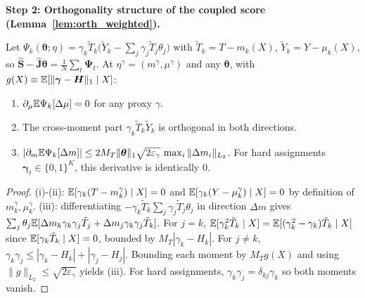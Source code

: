 \textbf{Step 2: Orthogonality structure of the coupled score (Lemma~\ref{lem:orth_weighted}).}
\begin{lemma}
\label{lem:orth_weighted}
Let $\Psi_{k}(\boldsymbol\theta;\eta)=\gamma_k\tilde T_k\big(\tilde Y_k-\sum_{j}\gamma_j\tilde T_j\theta_j\big)$ with $\tilde T_k=T-m_k(X)$, $\tilde Y_k=Y-\mu_k(X)$, so $\hat{\boldsymbol S}-\hat{\boldsymbol J}\boldsymbol\theta=\frac1N\sum_t\boldsymbol\Psi_t$. At $\eta^\gamma=(m^\gamma,\mu^\gamma)$ and any $\boldsymbol\theta$, with $g(X)\equiv\mathbb{E}[\|\boldsymbol\gamma-\boldsymbol H\|_1\mid X]$:
\begin{enumerate}\setlength{\itemsep}{0pt}\setlength{\parskip}{0pt}
\item[(i)] $\partial_\mu\mathbb{E}\Psi_k[\Delta\mu]=0$ for any proxy $\gamma$.
\item[(ii)] The cross-moment part $\gamma_k\tilde T_k\tilde Y_k$ is orthogonal in both directions.
\item[(iii)] $|\partial_m\mathbb{E}\Psi_k[\Delta m]|\le 2M_T\|\boldsymbol\theta\|_1\sqrt{2\varepsilon_\gamma}\,\max_i\|\Delta m_i\|_{L_2}$. For hard assignments $\boldsymbol\gamma_t\in\{0,1\}^K$, this derivative is identically $0$.
\end{enumerate}
\end{lemma}
\begin{proof}
(i)-(ii): $\mathbb{E}[\gamma_k(T-m_k^\gamma)\mid X]=0$ and $\mathbb{E}[\gamma_k(Y-\mu_k^\gamma)\mid X]=0$ by definition of $m_k^\gamma,\mu_k^\gamma$.
(iii): differentiating $-\gamma_k\tilde T_k \sum_j \gamma_j \tilde T_j \theta_j$ in direction $\Delta m$ gives $\sum_j \theta_j \mathbb{E}[\Delta m_k \gamma_k \gamma_j \tilde T_j + \Delta m_j \gamma_k \gamma_j \tilde T_k]$. For $j=k$, $\mathbb{E}[\gamma_k^2 \tilde T_k \mid X] = \mathbb{E}[(\gamma_k^2 - \gamma_k)\tilde T_k \mid X]$ since $\mathbb{E}[\gamma_k \tilde T_k \mid X] = 0$, bounded by $M_T |\gamma_k - H_k|$. For $j \neq k$, $\gamma_k \gamma_j \le |\gamma_k - H_k| + |\gamma_j - H_j|$. Bounding each moment by $M_T g(X)$ and using $\|g\|_{L_2} \le \sqrt{2\varepsilon_\gamma}$ yields (iii). For hard assignments, $\gamma_k \gamma_j = \delta_{kj} \gamma_k$ so both moments vanish.
\end{proof}

